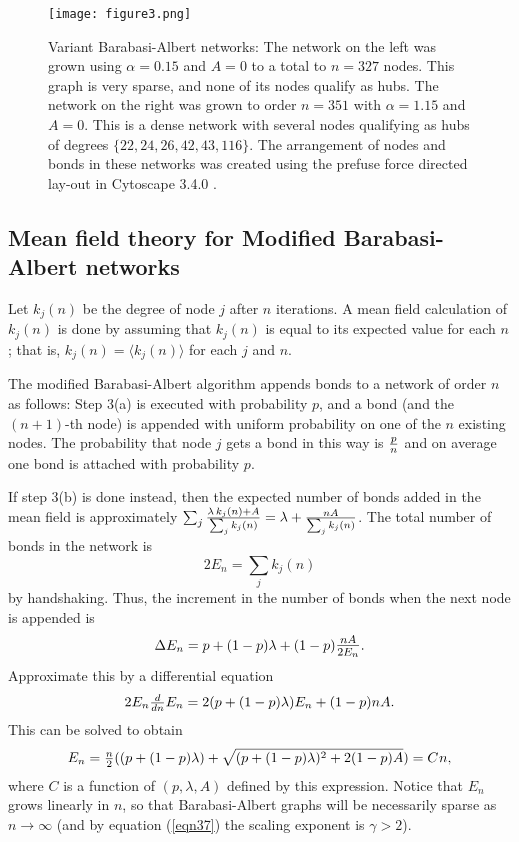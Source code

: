 \documentclass[12pt]{iopart}
\def\sfrac#1#2{\hbox{\normalsize $\frac{#1}{#2}$}}
\def\Sfrac#1#2{\hbox{\large$\frac{#1}{#2}$}}
\def\Ref#1{(\ref{#1})}
\def\thin{\:\!}
\begin{document}
\begin{figure}[h!]
 \centering
\texttt{[image: figure3.png]}
\caption{{Variant Barabasi-Albert networks:}
The network on the left was grown using $\alpha=0.15$ and $A=0$ to
a total to $n=327$ nodes.    This graph is very sparse, and none of its nodes 
qualify as hubs.  The network on the right was grown to order $n=351$ with
$\alpha=1.15$ and $A=0$.  This is a dense network with several nodes
qualifying as hubs of degrees $\{22,24,26,42,43,116\}$.
 The arrangement of nodes and bonds in
these networks was created using the prefuse force directed lay-out in Cytoscape 3.4.0
\cite{Cytoscape}.}
\label{figure3}
\end{figure}

\subsection{Mean field theory for Modified Barabasi-Albert networks}
Let $k_j(n)$ be the degree of node $j$ after $n$ iterations.  A mean field calculation
of $k_j(n)$ is done by assuming that $k_j(n)$ is equal to its expected value for each $n$;
that is, $k_j(n) = \langle k_j (n) \rangle$ for each $j$ and $n$.

The modified Barabasi-Albert algorithm appends bonds to a network of order $n$ as
follows:  Step 3(a) is executed with probability $p$, and a bond (and the $(n+1)$-th node)
is appended with uniform probability on one of the $n$ existing nodes.  The probability
that node $j$ gets a bond in this way is $\sfrac{p}{n}$ and on average one bond is attached
with probability $p$.

If step 3(b) is done instead, then the expected number
of bonds added in the mean field is approximately $\sum_j \sfrac{\lambda\,k_j(n)+A}{\sum_j k_j(n)}
= \lambda + \sfrac{nA}{\sum_j k_j(n)}$. The total number of bonds in the network is
\begin{equation}
2E_n = \sum_j k_j(n)
\end{equation}
by handshaking.  Thus, the increment in the number of bonds when the next node is appended is
\begin{equation}
\Delta E_n = p + (1-p)\lambda + (1-p)\Sfrac{nA}{2E_n} .
\end{equation}
Approximate this by a differential equation
\begin{equation}
2E_n \sfrac{d}{dn} E_n = 2(p+(1-p)\lambda) E_n + (1-p)nA.
\end{equation}
This can be solved to obtain
\begin{equation}
E_n = \sfrac{n}{2}((p+(1-p)\lambda)+\sqrt{(p+(1-p)\lambda)^2+2(1-p)A}) = C\thin n,
\label{eqn7}  %
\end{equation}
where $C$ is a function of $(p,\lambda,A)$ defined by this expression.  Notice that
$E_n$ grows linearly in $n$, so that Barabasi-Albert graphs will be necessarily sparse
as $n\to\infty$ (and by equation \Ref{eqn37} the scaling exponent is $\gamma>2$).
\end{document}
